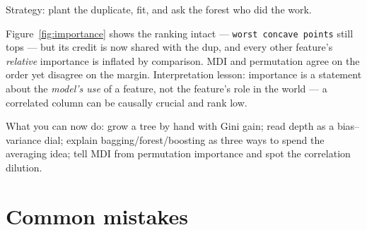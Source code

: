 \begin{example}\label{ex:dilution}
Strategy: plant the duplicate, fit, and ask the forest who did the work.
\par
\begin{solution}
Figure~\ref{fig:importance} shows the ranking intact --- \texttt{worst
concave points} still tops --- but its credit is now shared with the
dup, and every other feature's \emph{relative} importance is inflated
by comparison. MDI and permutation agree on the order yet disagree on
the margin. Interpretation lesson: importance is a statement about the
\emph{model's use} of a feature, not the feature's role in the world
--- a correlated column can be causally crucial and rank low.
\end{solution}
\end{example}

\begin{wins}
What you can now do: grow a tree by hand with Gini gain; read depth as a
bias--variance dial; explain bagging/forest/boosting as three ways to
spend the averaging idea; tell MDI from permutation importance and spot
the correlation dilution.
\end{wins}

\section{Common mistakes}

